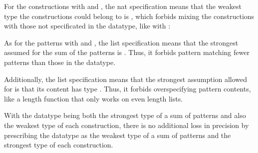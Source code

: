 \documentclass[acmsmall]{acmart}
\theoremstyle{definition}
\begin{document}

\noindent
For the constructions with  and , the nat specification 
means that the weakest type the constructions could belong to is ,
which forbids mixing the constructions with those not specificated in the datatype, like  with : 


\noindent
As for the patterns with  and , the list specification 
means that the strongest assumed for the sum of the patterns
is . 
Thus, it forbids pattern matching fewer patterns than those in the datatype.


\noindent
Additionally, the list specification 
means that the strongest assumption allowed for  is that its
content has type . Thus, 
it forbids overspecifying pattern contents,
like a length function that only works on even length lists.  


\noindent
With the datatype being both the strongest type of a sum of patterns and also the weakest
type of each construction, there is no additional loss in precision by
prescribing the datatype as the weakest type of a sum of patterns and the strongest type of    
each construction.
\end{document}
